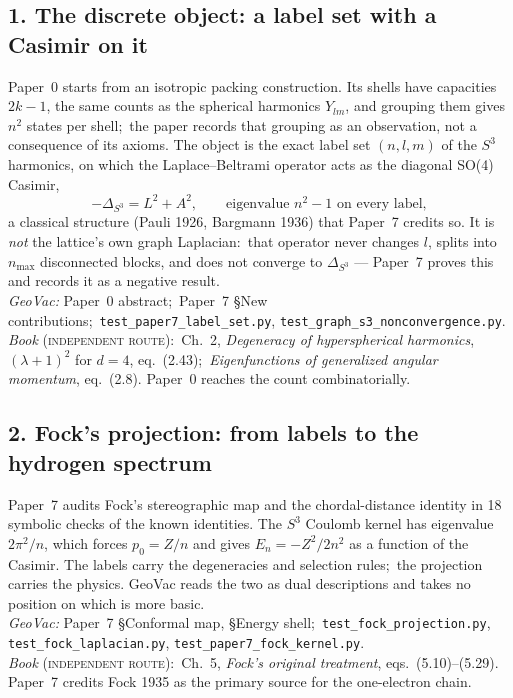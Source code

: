 \documentclass[11pt]{article}
\newcommand{\tst}[1]{\nolinkurl{#1}}
\newcommand{\rel}[1]{\textsc{#1}}
\newcommand{\bk}[1]{\textit{#1}}
\begin{document}
\subsection*{1. The discrete object: a label set with a Casimir on it}
Paper~0 starts from an isotropic packing construction. Its shells have
capacities $2k-1$, the same counts as the spherical harmonics $Y_{lm}$, and
grouping them gives $n^2$ states per shell;\ the paper records that
grouping as an observation, not a consequence of its axioms. The object is
the exact label set $(n,l,m)$ of the $S^3$ harmonics, on which the
Laplace--Beltrami operator acts as the diagonal SO(4) Casimir,
\[
-\Delta_{S^3} = L^2 + A^2,\qquad \text{eigenvalue } n^2-1 \text{ on every label},
\]
a classical structure (Pauli 1926, Bargmann 1936) that Paper~7 credits so.
It is \emph{not} the lattice's own graph Laplacian:\ that operator never
changes $l$, splits into $n_{\max}$ disconnected blocks, and does not
converge to $\Delta_{S^3}$ --- Paper~7 proves this and records it as a
negative result.\\
\emph{GeoVac:} Paper~0 abstract;\ Paper~7 \S New contributions;\
\tst{test_paper7_label_set.py}, \tst{test_graph_s3_nonconvergence.py}.\\
\emph{Book} (\rel{independent route}):\ Ch.~2, \bk{Degeneracy of
hyperspherical harmonics}, $(\lambda+1)^2$ for $d=4$, eq.~(2.43);\
\bk{Eigenfunctions of generalized angular momentum}, eq.~(2.8). Paper~0
reaches the count combinatorially.

\subsection*{2. Fock's projection: from labels to the hydrogen spectrum}
Paper~7 audits Fock's stereographic map and the chordal-distance identity
in 18 symbolic checks of the known identities. The $S^3$ Coulomb kernel
has eigenvalue $2\pi^2/n$, which forces $p_0=Z/n$ and gives
$E_n=-Z^2/2n^2$ as a function of the Casimir. The labels carry the
degeneracies and selection rules;\ the projection carries the physics.
GeoVac reads the two as dual descriptions and takes no position on which is
more basic.\\
\emph{GeoVac:} Paper~7 \S Conformal map, \S Energy shell;\
\tst{test_fock_projection.py}, \tst{test_fock_laplacian.py},
\tst{test_paper7_fock_kernel.py}.\\
\emph{Book} (\rel{independent route}):\ Ch.~5, \bk{Fock's original
treatment}, eqs.~(5.10)--(5.29). Paper~7 credits Fock 1935 as the primary
source for the one-electron chain.
\end{document}
